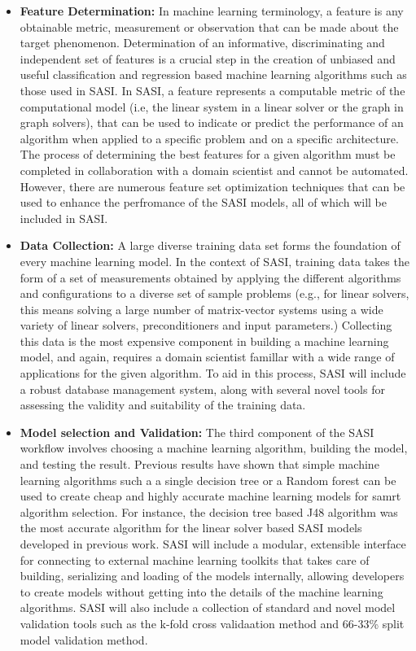 \begin{itemize}
 \item {\bf Feature Determination:} In machine learning terminology, a feature is any obtainable metric, measurement or observation that can be made about the target phenomenon. Determination of an informative, discriminating and independent set of features is a crucial step in the creation of unbiased and useful classification and regression based machine learning algorithms such as those used in SASI.  In SASI, a feature represents a computable metric of the computational model (i.e, the linear system in a linear solver or the graph in graph solvers), that can be used to indicate or predict the performance of an algorithm when applied to a specific problem and on a specific architecture. The process of determining the best features for a given algorithm must be completed in collaboration with a domain scientist and cannot be automated. However, there are numerous feature set optimization techniques that can be used to enhance the perfromance of the SASI models, all of which will be included in SASI.  
 
 \item {\bf Data Collection:} A large diverse training data set forms the foundation of every machine learning model. In the context of SASI, training data takes the form of a set of measurements obtained by applying the different algorithms and configurations to a diverse set of sample problems (e.g., for linear solvers, this means solving a large number of matrix-vector systems using a wide variety of linear solvers, preconditioners and input parameters.) Collecting this data is the most expensive component in building a machine learning model, and again, requires a domain scientist famillar with a wide range of applications for the given algorithm. To aid in this process, SASI will include a robust database management system, along with several novel tools for assessing the validity and suitability of the training data.  
 
 \item {\bf Model selection and Validation:} The third component of the SASI workflow involves choosing a machine learning algorithm, building the model, and testing the result. Previous results have shown that simple machine learning algorithms such a a single decision tree or a Random forest can be used to create cheap and highly accurate machine learning models for samrt algorithm selection. For instance, the decision tree based J48 algorithm was the most accurate algorithm for the linear solver based SASI models developed in previous work. SASI will include a modular, extensible interface for connecting to external machine learning toolkits that takes care of building, serializing and loading of the models internally, allowing developers to create models without getting into the details of the machine learning algorithms. SASI will also include a collection of standard and novel model validation tools such as the k-fold cross validaation method and 66-33\% split model validation method.    
 

\end{itemize}
